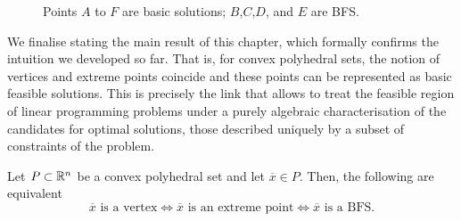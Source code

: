 \begin{figure}[h]
	\caption{Points $A$ to $F$ are basic solutions; $B$,$C$,$D$, and $E$ are BFS.} \label{p1c2:fig:BFS}
\end{figure}		

We finalise stating the main result of this chapter, which formally confirms the intuition we developed so far. That is, for convex polyhedral sets, the notion of vertices and extreme points coincide and these points can be represented as basic feasible solutions. This is precisely the link that allows to treat the feasible region of linear programming problems under a purely algebraic characterisation of the candidates for optimal solutions, those described uniquely by a subset of constraints of the problem.

\begin{theorem}\label{p1c2:thm:BFS_vertex_extreme_point}
	Let $P \subset \mathbb{R}^n$ be a convex polyhedral set and let $\overline{x} \in P$. Then, the following are equivalent
	$$	\overline{x} \text{ is a vertex} \iff \overline{x} \text{ is an extreme point} \iff \overline{x} \text{ is a BFS}.	
	$$
\end{theorem}


